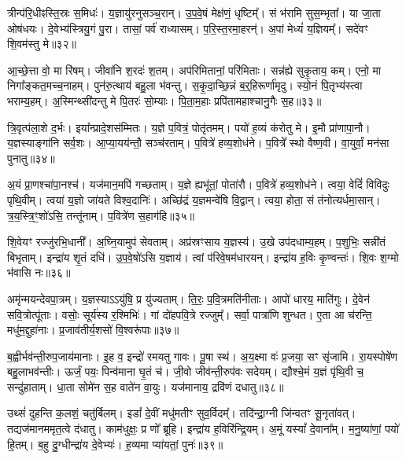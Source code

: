 त्रीन्प॑रि॒धीꣴस्ति॒स्रः स॒मिधः॑।
य॒ज्ञायु॑रनु\-सञ्च॒रान्।
उ॒प॒वे॒षं मेक्ष॑णं॒ धृष्टिम्᳚।
सं भ॑रामि सुस॒म्भृता᳚।
या जा॒ता ओष॑धयः।
दे॒वेभ्य॑स्त्रियु॒गं पु॒रा।
तासां॒ पर्व॑ राध्यासम्।
प॒रि॒स्त॒रमा॒हरन्॑।
अ॒पां मेध्यं॑ य॒ज्ञियम्᳚।
सदे॑वꣳ शि॒वम॑स्तु मे॥३२॥\ip

आ॒च्छे॒त्ता वो॒ मा रि॑षम्।
जीवा॑नि श॒रदः॑ श॒तम्।
अप॑रिमितानां॒ परि॑मिताः।
सन्न॑ह्ये सुकृ॒ताय॒ कम्।
एनो॒ मा निगा᳚ङ्कत॒मच्च॒नाहम्।
पुन॑रु॒त्थाय॑ बहु॒ला भ॑वन्तु।
स॒कृ॒दा॒च्छि॒न्नं ब॒र्॒हिरूर्णा॑मृदु।
स्यो॒नं पि॒तृभ्य॑स्त्वा भराम्य॒हम्।
अ॒स्मिन्थ्सी॑दन्तु मे पि॒तरः॑ सो॒म्याः।
पि॒ता॒म॒हाः प्रपि॑तामहाश्चानु॒गैः स॒ह॥३३॥\ip

त्रि॒वृत्प॑ला॒शे द॒र्भः।
इया᳚न्प्रादे॒शस॑म्मितः।
य॒ज्ञे प॒वित्रं॒ पोतृ॑तमम्।
पयो॑ ह॒व्यं क॑रोतु मे।
इ॒मौ प्रा॑णापा॒नौ।
य॒ज्ञस्याङ्गा॑नि सर्व॒शः।
आ॒प्या॒यय॑न्तौ॒ सञ्च॑रताम्।
प॒वित्रे॑ हव्य॒शोध॑ने।
प॒वित्रे᳚ स्थो वैष्ण॒वी।
वा॒युर्वां॒ मन॑सा पुनातु॥३४॥\ip

अ॒यं प्रा॒णश्चा॑पा॒नश्च॑।
यज॑मान॒मपि॑ गच्छताम्।
य॒ज्ञे ह्यभू॑तां॒ पोता॑रौ।
प॒वित्रे॑ हव्य॒शोध॑ने।
त्वया॒ वेदिं॑ विविदुः पृथि॒वीम्।
त्वया॑ य॒ज्ञो जा॑यते विश्व॒दानिः॑।
अच्छि॑द्रं य॒ज्ञमन्वे॑षि वि॒द्वान्।
त्वया॒ होता॒ सं त॑नोत्यर्धमा॒सान्।
त्र॒य॒स्त्रि॒ꣳ॒शो॑ऽसि॒ तन्तू॑नाम्।
प॒वित्रे॑ण स॒हाग॑हि॥३५॥\ip

शि॒वेयꣳ रज्जु॑रभि॒धानी᳚।
अ॒घ्नि॒यामुप॑ सेवताम्।
अप्र॑स्रꣳसाय य॒ज्ञस्य॑।
उ॒खे उप॑दधाम्य॒हम्।
प॒शुभिः॒ सन्नी॑तं बिभृताम्।
इन्द्रा॑य शृ॒तं दधि॑।
उ॒प॒वे॒षो॑ऽसि य॒ज्ञाय॑।
त्वां प॑रिवे॒षम॑धारयन्।
इन्द्रा॑य ह॒विः कृ॒ण्वन्तः॑।
शि॒वः श॒ग्मो भ॑वासि नः॥३६॥\ip

अमृ॑न्मयन्देवपा॒त्रम्।
य॒ज्ञस्याऽऽयु॑षि॒ प्र यु॑ज्यताम्।
ति॒रः॒ प॒वि॒त्रमति॑नीताः।
आपो॑ धारय॒ माति॑गुः।
दे॒वेन॑ सवि॒त्रोत्पू॑ताः।
वसोः॒ सूर्य॑स्य र॒श्मिभिः॑।
गां दो॑हपवि॒त्रे रज्जुम्᳚।
सर्वा॒ पात्रा॑णि शुन्धत।
ए॒ता आ च॑रन्ति॒ मधु॑म॒द्दुहा॑नाः।
प्र॒जाव॑तीर्य॒शसो॑ वि॒श्वरू॑पाः॥३७॥\ip

ब॒ह्वीर्भव॑न्ती॒रुप॒जाय॑मानाः।
इ॒ह व॒ इन्द्रो॑ रमयतु गावः।
पू॒षा स्थ॑।
अ॒य॒क्ष्मा वः॑ प्र॒जया॒ सꣳ सृ॑जामि।
रा॒यस्पोषे॑ण बहु॒लाभव॑न्तीः।
ऊर्जं॒ पयः॒ पिन्व॑माना घृ॒तं च॑।
जी॒वो जीव॑न्ती॒रुप॑वः सदेयम्।
द्यौश्चे॒मं य॒ज्ञं पृ॑थि॒वी च॒ सन्दु॑हाताम्।
धा॒ता सोमे॑न स॒ह वाते॑न वा॒युः।
यज॑मानाय॒ द्रवि॑णं दधातु॥३८॥\ip

उथ्सं॑ दुहन्ति क॒लशं॒ चतु॑र्बिलम्।
इडां᳚ दे॒वीं मधु॑मतीꣳ सुव॒र्विदम्᳚।
तदि॑न्द्रा॒ग्नी जि॑न्वतꣳ सू॒नृता॑वत्।
तद्यज॑मान\-ममृत॒त्वे द॑धातु।
काम॑धुक्षः॒ प्र णो᳚ ब्रूहि।
इन्द्रा॑य ह॒विरि॑न्द्रि॒यम्।
अ॒मूं यस्यां᳚ दे॒वाना᳚म्।
म॒नु॒ष्या॑णां॒ पयो॑ हि॒तम्।
ब॒हु दु॒ग्धीन्द्रा॑य दे॒वेभ्यः॑।
ह॒व्यमा प्या॑यतां॒ पुनः॑॥३९॥\ip

